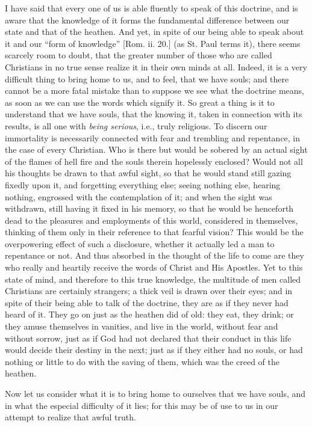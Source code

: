 I have said that every one of us is able fluently to
speak of this doctrine, and is aware that the knowledge
of it forms the fundamental difference between our state
and that of the heathen. And yet, in spite of our being
able to speak about it and our ``form of knowledge'' [Rom. ii. 20.] (as St. Paul terms it), there seems
scarcely room to doubt, that the greater number of those
who are called Christians in no true sense realize it in
their own minds at all. Indeed, it is a very difficult
thing to bring home to us, and to feel, that we have
souls; and there cannot be a more fatal mistake than to
suppose we see what the doctrine means, as soon as we can
use the words which signify it. So great a thing is it to
understand that we have souls, that the knowing it, taken
in connection with its results, is all one with \emph{being
serious}, i.e., truly religious. To discern our
immortality is necessarily connected with fear and
trembling and repentance, in the case of every Christian.
Who is there but would be sobered by an actual sight of
the flames of hell fire and the souls therein hopelessly
enclosed? Would not all his thoughts be drawn to that
awful sight, so that he would stand still gazing fixedly
upon it, and forgetting everything else; seeing nothing
else, hearing nothing, engrossed with the contemplation
of it; and when the sight was withdrawn, still having it
fixed in his memory, so that he would be henceforth dead
to the pleasures and employments of this world,
considered in themselves, thinking of them only in their
reference to that fearful vision? This would be the
overpowering effect of such a disclosure, whether it
actually led a man to repentance or not. And thus
absorbed in the thought of the life to come are they who
really and heartily receive the words of Christ and His
Apostles. Yet to this state of mind, and therefore to
this true knowledge, the multitude of men called
Christians are certainly strangers; a thick veil is drawn
over their eyes; and in spite of their being able to talk
of the doctrine, they are as if they never had heard of
it. They go on just as the heathen did of old: they eat,
they drink; or they amuse themselves in vanities, and
live in the world, without fear and without sorrow, just
as if God had not declared that their conduct in this
life would decide their destiny in the next; just as if
they either had no souls, or had nothing or little to do
with the saving of them, which was the creed of the
heathen.

Now let us consider what it is to bring home to
ourselves that we have souls, and in what the especial
difficulty of it lies; for this may be of use to us in
our attempt to realize that awful truth.

